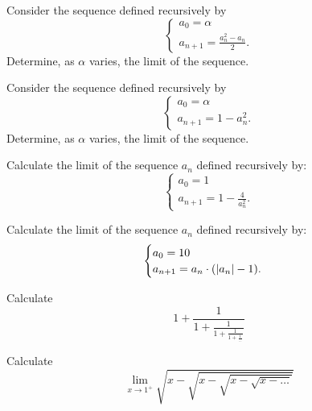 \begin{exercise}
  Consider the sequence defined recursively by
  \[
  \begin{cases}
    a_0 = \alpha\\
    a_{n+1} = \frac{a_n^2-a_n}{2}.
  \end{cases}
  \]
  Determine, as $\alpha$ varies, the limit of the sequence.
\end{exercise}

\begin{exercise}
  Consider the sequence defined recursively by
  \[
  \begin{cases}
    a_0 = \alpha \\
    a_{n+1} = 1 - a_n^2.
  \end{cases}
  \]
  Determine, as $\alpha$ varies, the limit of the sequence.
\end{exercise}

\begin{exercise}
  Calculate the limit of the sequence $a_n$ 
  defined recursively by:
    \[
    \begin{cases}
      a_0 = 1\\
      a_{n+1} = 1 - \frac {4}{a_n^2}.
    \end{cases}
    \]
  \end{exercise}
  
\begin{exercise}
  Calculate the limit of the sequence $a_n$
  defined recursively by:
  \[
    \begin{cases}
      a_0 = 10\\
      a_{n+1} = a_n \cdot ({\left|a_n\right|}-1).
    \end{cases}
  \]
\end{exercise}
  
\begin{exercise}
Calculate
\[
 1 + \frac{1}{1+\frac{1}{1+\frac{1}{1+\frac{1}{\dots}}}}
\]
\end{exercise}

\begin{exercise}
Calculate
\[
  \lim_{x\to 1^+} \sqrt{x-\sqrt{x- \sqrt{x-\sqrt{x - \dots}}}}
\]
\end{exercise}

